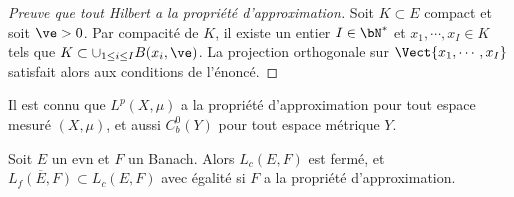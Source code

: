\begin{proof}[Preuve que tout Hilbert a la propriété d'approximation]
	Soit $K \subset E$ compact et soit $\ve>0$. Par compacité de $K$, il existe un entier $I \in \bN^*$ et  $x_1,\cdots,x_I \in K$ tels que $K \subset \cup_{1 \leq i \leq I}  B(x_i,\ve)$. La projection orthogonale sur $\Vect\{x_1,\cdots,x_I\}$ satisfait alors aux conditions de l'énoncé. 
\end{proof}

Il est connu que $L^p(X,\mu)$ a la propriété d'approximation pour tout espace mesuré $(X,\mu)$, et aussi $C_b^0(Y)$ pour tout espace métrique $Y$. 



%
%
%

\begin{proposition}
\label{prop:limRangFini}
	Soit $E$ un evn et $F$ un Banach.
	Alors $L_c(E,F)$ est fermé, et $\overline {L_f(E,F)} \subset L_c(E,F)$ avec égalité si $F$ a la propriété d'approximation. %
\end{proposition}


